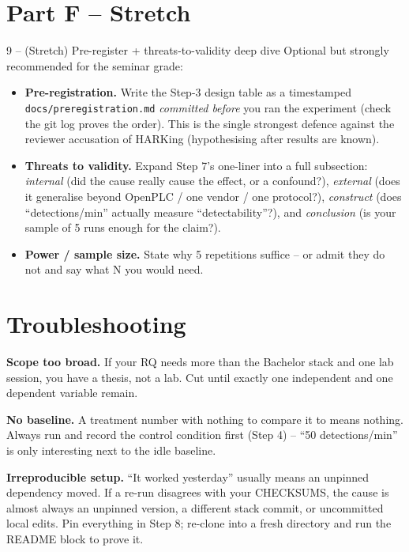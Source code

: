 \documentclass[11pt,a4paper]{article}
\begin{document}
\section*{Part F -- Stretch}

\begin{stepbox}{9 -- (Stretch) Pre-register + threats-to-validity deep dive}
Optional but strongly recommended for the seminar grade:
\begin{itemize}\setlength{\itemsep}{1pt}
  \item \textbf{Pre-registration.} Write the Step-3 design table as a timestamped \texttt{docs/preregistration.md} \emph{committed before} you ran the experiment (check the git log proves the order). This is the single strongest defence against the reviewer accusation of HARKing (hypothesising after results are known).
  \item \textbf{Threats to validity.} Expand Step 7's one-liner into a full subsection: \emph{internal} (did the cause really cause the effect, or a confound?), \emph{external} (does it generalise beyond OpenPLC / one vendor / one protocol?), \emph{construct} (does ``detections/min'' actually measure ``detectability''?), and \emph{conclusion} (is your sample of 5 runs enough for the claim?).
  \item \textbf{Power / sample size.} State why 5 repetitions suffice -- or admit they do not and say what N you would need.
\end{itemize}
\end{stepbox}

\section*{Troubleshooting}

\begin{notebox}
\textbf{Scope too broad.} If your RQ needs more than the Bachelor stack and one lab session, you have a thesis, not a lab. Cut until exactly one independent and one dependent variable remain.

\vspace{1mm}
\textbf{No baseline.} A treatment number with nothing to compare it to means nothing. Always run and record the control condition first (Step 4) -- ``50 detections/min'' is only interesting next to the idle baseline.

\vspace{1mm}
\textbf{Irreproducible setup.} ``It worked yesterday'' usually means an unpinned dependency moved. If a re-run disagrees with your CHECKSUMS, the cause is almost always an unpinned version, a different stack commit, or uncommitted local edits. Pin everything in Step 8; re-clone into a fresh directory and run the README block to prove it.
\end{notebox}
\end{document}
